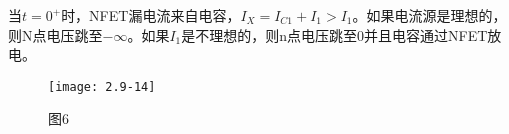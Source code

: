 当$t=0^+$时，NFET漏电流来自电容，$I_X=I_{C1}+I_1>I_1$。如果电流源是理想的，则N点电压跳至$-\infty$。如果$I_1$是不理想的，则n点电压跳至0并且电容通过NFET放电。





		\begin{figure}[H] %
	\begin{minipage}{\linewidth}
		\texttt{[image: 2.9-14]}
	\end{minipage}
	\caption*{图6} %
\end{figure}



\color{black}{
	
}